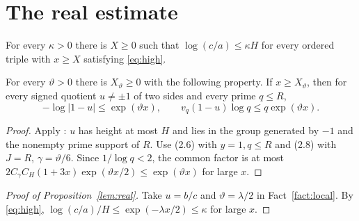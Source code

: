 \section{The real estimate}\label{sec:real}
\begin{proposition}\label{lem:real}
For every $\kappa>0$ there is $X\ge0$
such that $\log(c/a)\le\kappa H$ for every ordered triple with $x\ge X$
satisfying \eqref{eq:high}.
\end{proposition}

\begin{fact}\label{fact:local}
For every $\vartheta>0$ there is $X_{\vartheta}\ge0$ with the following
property. If $x\ge X_{\vartheta}$, then for every signed quotient
$u\ne\pm1$ of two sides and every prime $q\le R$,
\[
 -\log|1-u|\le \exp(\vartheta x),\qquad
 v_q(1-u)\log q\le q\exp(\vartheta x).
\]
\end{fact}
\begin{proof}
Apply \cite[Fact F3, Lemma~2.1, (2.3)--(2.4)]{Zhang2026Third}:
$u$ has height at most $H$ and lies in the group generated by $-1$
and the nonempty prime support of $R$. Use (2.6) with $y=1,q\le R$
and (2.8) with $J=R$, $\gamma=\vartheta/6$.
Since $1/\log q<2$, the common factor is at most
$2C_\gamma C_H(1+3x)\exp(\vartheta x/2)\le\exp(\vartheta x)$
for large $x$.
\end{proof}
\begin{proof}[Proof of Proposition~\ref{lem:real}]
Take $u=b/c$ and $\vartheta=\lambda/2$ in Fact~\ref{fact:local}.
By \eqref{eq:high}, $\log(c/a)/H\le\exp(-\lambda x/2)\le\kappa$ for large $x$.
\end{proof}
